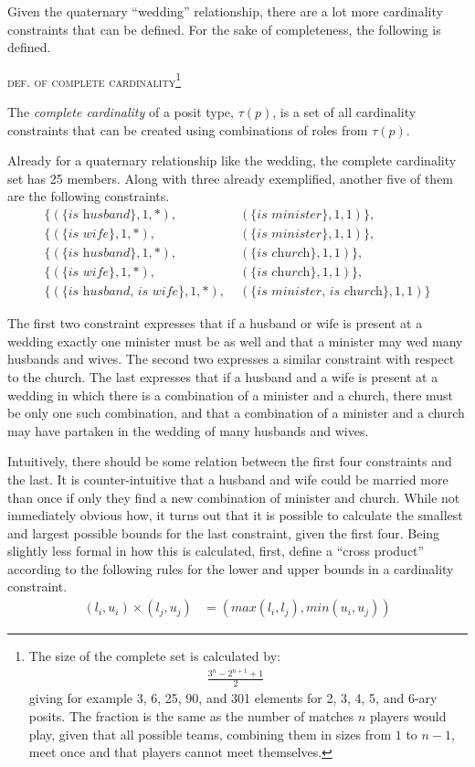 \documentclass[sfsidenotes,nobib,twoside,symmetric]{tufte-handout}
\newcommand{\typeof}[1]{\tau(#1)}
\newcounter{majorcount}
\newcommand{\deffy}[3]{
	\vspace{2ex}
	\refstepcounter{majorcount} 
	\noindent\textsc{#1}%
	\\\begin{small}
	\noindent #2%
	\label{Def:#3}
	\end{small}
	\vspace{2ex}
}
\begin{document}
Given the quaternary \enquote{wedding} relationship, there are a lot more cardinality constraints that can be defined. For the sake of completeness, the following is defined. 

\deffy{def. of complete cardinality\footnote{The size of the complete set is calculated by: 
\begin{align*}
\frac{3^n-2^{n+1}+1}{2}\qquad
\end{align*} giving for example 3, 6, 25, 90, and 301 elements for 2, 3, 4, 5, and 6-ary posits. The fraction is the same as the number of matches $n$ players would play, given that all possible teams, combining them in sizes from $1$ to $n-1$, meet once and that players cannot meet themselves.}}{%
The \emph{complete cardinality} of a posit type, $\typeof{p}$, is a set of all cardinality constraints that can be created using combinations of roles from $\typeof{p}$.
}{cardinality}

Already for a quaternary relationship like the wedding, the complete cardinality set has 25 members. Along with three already exemplified, another five of them are the following constraints.
\begin{align*}
\{(\{\textit{is husband}\}, 1, *),\;& (\{\textit{is minister}\}, 1, 1)\}, \\
\{(\{\textit{is wife}\}, 1, *),\;& (\{\textit{is minister}\}, 1, 1)\}, \\
\{(\{\textit{is husband}\}, 1, *),\;& (\{\textit{is church}\}, 1, 1)\}, \\
\{(\{\textit{is wife}\}, 1, *),\;& (\{\textit{is church}\}, 1, 1)\}, \\
\{(\{\textit{is husband, is wife}\}, 1, *),\;& (\{\textit{is minister, is church}\}, 1, 1)\}
\end{align*}

The first two constraint expresses that if a husband or wife is present at a wedding exactly one minister must be as well and that a minister may wed many husbands and wives. The second two expresses a similar constraint with respect to the church. The last expresses that if a husband and a wife is present at a wedding in which there is a combination of a minister and a church, there must be only one such combination, and that a combination of a minister and a church may have partaken in the wedding of many husbands and wives. 

Intuitively, there should be some relation between the first four constraints and the last. It is counter-intuitive that a husband and wife could be married more than once if only they find a new combination of minister and church. While not immediately obvious how, it turns out that it is possible to calculate the smallest and largest possible bounds for the last constraint, given the first four. Being slightly less formal in how this is calculated, first, define a \enquote{cross product} according to the following rules for the lower and upper bounds in a cardinality constraint.
\begin{align*}
(l_i, u_i)\times (l_j, u_j) &= (max(l_i, l_j), min(u_i, u_j)) 
\end{align*}
\end{document}
